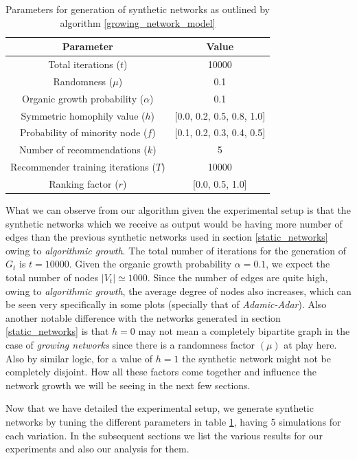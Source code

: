 \begin{table}[h]
	\centering
	\begin{tabular}{ |c|c| }
		\hline
		\textbf{Parameter} & \textbf{Value} \\
		\hline
		Total iterations ($t$) & 10000 \\
		Randomness ($\mu$) & 0.1 \\
		Organic growth probability ($\alpha$) & 0.1 \\
		Symmetric homophily value ($h$) & [0.0, 0.2, 0.5, 0.8, 1.0] \\
		Probability of minority node ($f$) & [0.1, 0.2, 0.3, 0.4, 0.5] \\
		Number of recommendations ($k$) & 5 \\
		Recommender training iterations ($T$) & 10000 \\
		Ranking factor ($r$) & [0.0, 0.5, 1.0] \\
		\hline
	\end{tabular}
	\caption{Parameters for generation of synthetic networks as outlined by algorithm \ref{growing_network_model}}
	\label{table_growth_model}
\end{table}

What we can observe from our algorithm given the experimental setup is that the synthetic networks which we receive as output would be having more number of edges than the previous synthetic networks used in section \ref{static_networks} owing to \textit{algorithmic growth}. The total number of iterations for the generation of $G_{t}$ is $t=10000$. Given the organic growth probability $\alpha=0.1$, we expect the total number of nodes $|V_{t}| \simeq 1000$. Since the number of edges are quite high, owing to \textit{algorithmic growth}, the average degree of nodes also increases, which can be seen very specifically in some plots (specially that of \textit{Adamic-Adar}). Also another notable difference with the networks generated in section \ref{static_networks} is that $h=0$ may not mean a completely bipartite graph in the case of \textit{growing networks} since there is a randomness factor $(\mu)$ at play here. Also by similar logic, for a value of $h=1$ the synthetic network might not be completely disjoint. How all these factors come together and influence the network growth we will be seeing in the next few sections.

Now that we have detailed the experimental setup, we generate synthetic networks by tuning the different parameters in table \ref{table_growth_model}, having 5 simulations for each variation. In the subsequent sections we list the various results for our experiments and also our analysis for them. 

